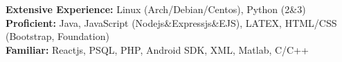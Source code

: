 

\begin{cvparagraph}

  \textbf{Extensive Experience:} Linux (Arch/Debian/Centos), Python (2\&3)\\
  \textbf{Proficient:} Java, JavaScript (Nodejs\&Expressjs\&EJS), LATEX, HTML/CSS (Bootstrap, Foundation)\\
  \textbf{Familiar:} Reactjs, PSQL, PHP, Android SDK, XML, Matlab, C/C++
\end{cvparagraph}
